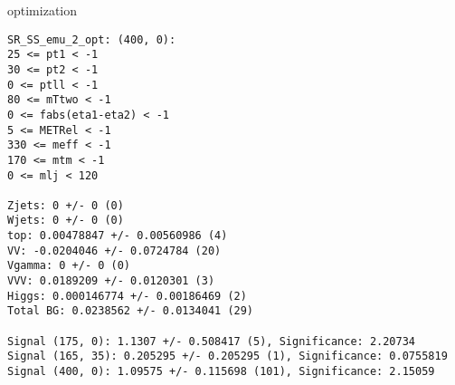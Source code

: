 \begin{frame}[fragile]{optimization}
\tiny
\begin{verbatim}
SR_SS_emu_2_opt: (400, 0):
25 <= pt1 < -1
30 <= pt2 < -1
0 <= ptll < -1
80 <= mTtwo < -1
0 <= fabs(eta1-eta2) < -1
5 <= METRel < -1
330 <= meff < -1
170 <= mtm < -1
0 <= mlj < 120

Zjets: 0 +/- 0 (0)
Wjets: 0 +/- 0 (0)
top: 0.00478847 +/- 0.00560986 (4)
VV: -0.0204046 +/- 0.0724784 (20)
Vgamma: 0 +/- 0 (0)
VVV: 0.0189209 +/- 0.0120301 (3)
Higgs: 0.000146774 +/- 0.00186469 (2)
Total BG: 0.0238562 +/- 0.0134041 (29)

Signal (175, 0): 1.1307 +/- 0.508417 (5), Significance: 2.20734
Signal (165, 35): 0.205295 +/- 0.205295 (1), Significance: 0.0755819
Signal (400, 0): 1.09575 +/- 0.115698 (101), Significance: 2.15059
\end{verbatim}
\end{frame}
